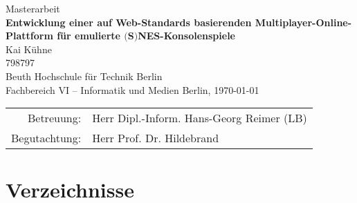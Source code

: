 \documentclass[ngerman]{scrbook}
\newcommand{\myauthor}{Kai Kühne}  %
\newcommand{\mytitle}{Entwicklung einer auf Web-Standards basierenden Multiplayer-Online-Plattform für emulierte $($S$)$NES-Konsolenspiele}
\begin{document}
\frontmatter



\dedication{%
              Meinem Schnuckelchen\\
              in ewiger Liebe\\
              von Deinem Hasenboppelchen.}

\begin{titlepage}
\vspace*{\fill}
\begin{center}
\LARGE
Masterarbeit\\
\Large
\textbf{\mytitle}\\[1cm]
\large
\myauthor{}\\
798797\\[1cm]
Beuth Hochschule für Technik Berlin\\
Fachbereich VI -- Informatik und Medien
\vfill
\vfill
Berlin, \today
\normalsize
\vfill
\vfill
\begin{tabular}{rl}
Betreuung: & Herr Dipl.-Inform. Hans-Georg Reimer (LB)\\
Begutachtung: & Herr Prof. Dr. Hildebrand
\end{tabular}
\end{center}
\vspace*{\fill}
\end{titlepage}

\tableofcontents
\cleardoublepage

\mainmatter












\backmatter


\part{Verzeichnisse} %

\cleardoublepage
\listoffigures

\printbibheading[heading=bibnumbered,title={Literatur}]
\printbibliography[heading=subbibliography,title={Print},type=book]
\printbibliography[heading=subbibliography,title={Web},type=online]

\printindex

\glsaddall %
\printglossary[type=main,title=Glossar,toctitle=Glossar]
\printglossary[type=\acronymtype,title=Akronyme,toctitle=Akronyme]

\backmatter

\end{document}
